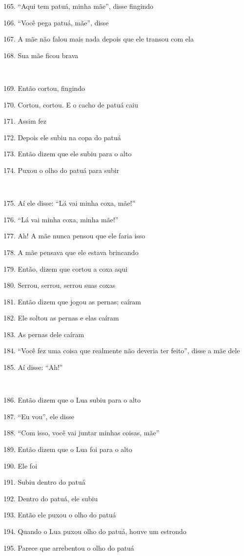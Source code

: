 165. ``Aqui tem patuá, minha mãe'', disse fingindo

166. ``Você pega patuá, mãe'', disse

167. A mãe não falou mais nada depois que ele transou com ela

168. Sua mãe ficou brava

~

169. Então cortou, fingindo

170. Cortou, cortou. E o cacho de patuá caiu

171. Assim fez

172. Depois ele subiu na copa do patuá

173. Então dizem que ele subiu para o alto

174. Puxou o olho do patuá para subir

~

175. Aí ele disse: ``Lá vai minha coxa, mãe!''

176. ``Lá vai minha coxa, minha mãe!''

177. Ah! A mãe nunca pensou que ele faria isso

178. A mãe pensava que ele estava brincando

179. Então, dizem que cortou a coxa aqui

180. Serrou, serrou, serrou suas coxas

181. Então dizem que jogou as pernas; caíram

182. Ele soltou as pernas e elas caíram

183. As pernas dele caíram

184. ``Você fez uma coisa que realmente não deveria ter feito'', disse a
mãe dele

185. Aí disse: ``Ah!''

~

186. Então dizem que o Lua subiu para o alto

187. ``Eu vou'', ele disse

188. ``Com isso, você vai juntar minhas coisas, mãe''

189. Então dizem que o Lua foi para o alto

190. Ele foi

191. Subiu dentro do patuá

192. Dentro do patuá, ele subiu

193. Então ele puxou o olho do patuá

194. Quando o Lua puxou olho do patuá, houve um estrondo

195. Parece que arrebentou o olho do patuá

